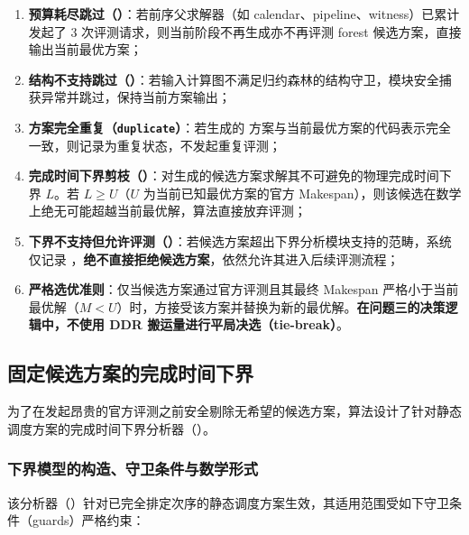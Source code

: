 \documentclass[anonymous,notoc]{gmcm2026}
\providecommand{\tightlist}{\setlength{\itemsep}{0pt}\setlength{\parskip}{0pt}}
\begin{document}
\begin{enumerate}
\def\labelenumi{\arabic{enumi}.}
\tightlist
\item
  \textbf{预算耗尽跳过（\texttt{}）}：若前序父求解器（如 calendar、pipeline、witness）已累计发起了 3 次评测请求，则当前阶段不再生成亦不再评测 forest 候选方案，直接输出当前最优方案；
\item
  \textbf{结构不支持跳过（\texttt{}）}：若输入计算图不满足归约森林的结构守卫，模块安全捕获异常并跳过，保持当前方案输出；
\item
  \textbf{方案完全重复（\texttt{duplicate}）}：若生成的 \texttt{} 方案与当前最优方案的代码表示完全一致，则记录为重复状态，不发起重复评测；
\item
  \textbf{完成时间下界剪枝（\texttt{}）}：对生成的候选方案求解其不可避免的物理完成时间下界 \(L\)。若 \(L \ge U\)（\(U\) 为当前已知最优方案的官方 Makespan），则该候选在数学上绝无可能超越当前最优解，算法直接放弃评测；
\item
  \textbf{下界不支持但允许评测（\texttt{}）}：若候选方案超出下界分析模块支持的范畴，系统仅记录 \texttt{}，\textbf{绝不直接拒绝候选方案}，依然允许其进入后续评测流程；
\item
  \textbf{严格选优准则}：仅当候选方案通过官方评测且其最终 Makespan 严格小于当前最优解（\(M < U\)）时，方接受该方案并替换为新的最优解。\textbf{在问题三的决策逻辑中，不使用 DDR 搬运量进行平局决选（tie-break）}。
\end{enumerate}

\subsection{固定候选方案的完成时间下界}

为了在发起昂贵的官方评测之前安全剔除无希望的候选方案，算法设计了针对静态调度方案的完成时间下界分析器（\texttt{}）。

\subsubsection{下界模型的构造、守卫条件与数学形式}

该分析器（\texttt{}）针对已完全排定次序的静态调度方案生效，其适用范围受如下守卫条件（guards）严格约束：
\end{document}
